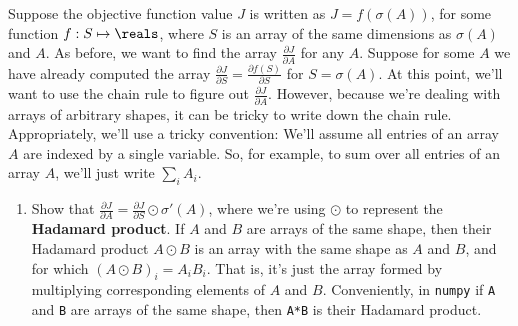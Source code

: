 \documentclass{article}
\theoremstyle{plain}
\theoremstyle{definition}
\begin{document}
Suppose the objective function value $J$ is written as $J=f(\sigma(A))$,
for some function $f:S\mapsto\reals$, where $S$ is an array of the
same dimensions as $\sigma(A)$ and $A$. As before, we want to find
the array $\frac{\partial J}{\partial A}$ for any $A$. Suppose for
some $A$ we have already computed the array $\frac{\partial J}{\partial S}=\frac{\partial f(S)}{\partial S}$
for $S=\sigma(A)$. At this point, we'll want to use the chain rule
to figure out $\frac{\partial J}{\partial A}$. However, because we're
dealing with arrays of arbitrary shapes, it can be tricky to write
down the chain rule. Appropriately, we'll use a tricky convention:
We'll assume all entries of an array $A$ are indexed by a single
variable. So, for example, to sum over all entries of an array $A$,
we'll just write $\sum_{i}A_{i}$. 
\begin{enumerate}
\setcounter{enumi}{\value{saveenum}}
\item Show that $\frac{\partial J}{\partial A}=\frac{\partial J}{\partial S}\odot\sigma'(A)$,
where we're using $\odot$ to represent the \textbf{Hadamard product}.
If $A$ and $B$ are arrays of the same shape, then their Hadamard
product $A\odot B$ is an array with the same shape as $A$ and $B$,
and for which $\left(A\odot B\right)_{i}=A_{i}B_{i}$. That is, it's
just the array formed by multiplying corresponding elements of $A$
and $B$. Conveniently, in \texttt{numpy} if \texttt{A} and \texttt{B}
are arrays of the same shape, then \texttt{A{*}B} is their Hadamard
product.



\setcounter{saveenum}{\value{enumi}}
\end{enumerate}
\end{document}
